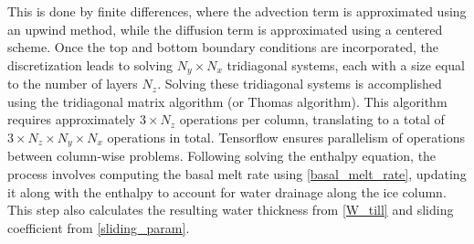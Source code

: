 \documentclass[gmd]{copernicus}
\begin{document}
This is done by finite differences, where the advection term is approximated using an upwind method, while the diffusion term is approximated using a centered scheme. Once the top and bottom boundary conditions are incorporated, the discretization leads to solving $N_y \times N_x$ tridiagonal systems, each with 
a size equal to the number of layers $N_z$. Solving these tridiagonal systems is accomplished using the tridiagonal matrix algorithm (or Thomas algorithm). This algorithm requires approximately $3 \times N_z$ operations per column, translating to a total of $3 \times N_z \times N_y \times N_x$ operations in total. Tensorflow ensures  parallelism of operations between column-wise problems. Following solving the enthalpy equation, the process involves computing the basal melt rate using \eqref{basal_melt_rate}, updating it along with the enthalpy to account for water drainage along the ice column. This step also calculates the resulting water thickness from \eqref{W_till} and sliding coefficient from \eqref{sliding_param}.
\end{document}
